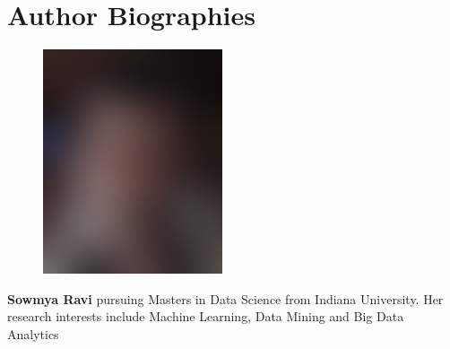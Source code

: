 \documentclass[9pt,twocolumn,twoside]{../../styles/osajnl}
\begin{document}
\section*{Author Biographies}
\begingroup
\setlength\intextsep{0pt}
\begin{minipage}[t][3.2cm][t]{1.0\columnwidth} %
  \begin{figure}
    \includegraphics[width=0.25\columnwidth]{images/john_smith.eps}
  \end{figure}
  \noindent
  {\bfseries Sowmya Ravi} pursuing Masters in Data Science from Indiana University. Her research interests include Machine Learning, Data Mining and Big Data Analytics
\end{minipage}

\endgroup

\newpage

\appendix
\end{document}
